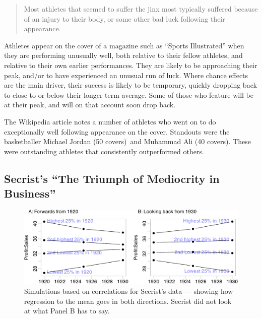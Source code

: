 \documentclass[
  10pt,
  b5paper]{book}
\begin{document}
\begin{quote}
Most athletes that seemed to suffer the jinx most typically
suffered because of an injury to their body, or some other bad
luck following their appearance.
\end{quote}

Athletes appear on the cover of a magazine such as ``Sports Illustrated''
when they are performing unusually well, both relative to their fellow
athletes, and relative to their own earlier performances. They are
likely to be approaching their peak, and/or to have experienced an
unusual run of luck. Where chance effects are the main driver,
their success is likely to be temporary, quickly dropping back to close
to or below their longer term average. Some of those who feature will
be at their peak, and will on that account soon drop back.

The Wikipedia article notes a number of athletes who went on to do
exceptionally well following appearance on the cover. Standouts
were the basketballer Michael Jordan (50 covers)~and Muhammad Ali
(40 covers). These were outstanding athletes that consistently
outperformed others.

\hypertarget{secrists-the-triumph-of-mediocrity-in-business}{%
\subsection*{Secrist's ``The Triumph of Mediocrity in Business''}\label{secrists-the-triumph-of-mediocrity-in-business}}

\begin{figure}[H]

{\centering \includegraphics[width=1.05\linewidth]{07-regress_files/figure-latex/sim-1} 

}

\caption{Simulations based on correlations for Secrist's data --- 
               showing how regression to the mean goes in both directions.
               Secrist did not look at what Panel B has to say.}\label{fig:sim}
\end{figure}
\end{document}
